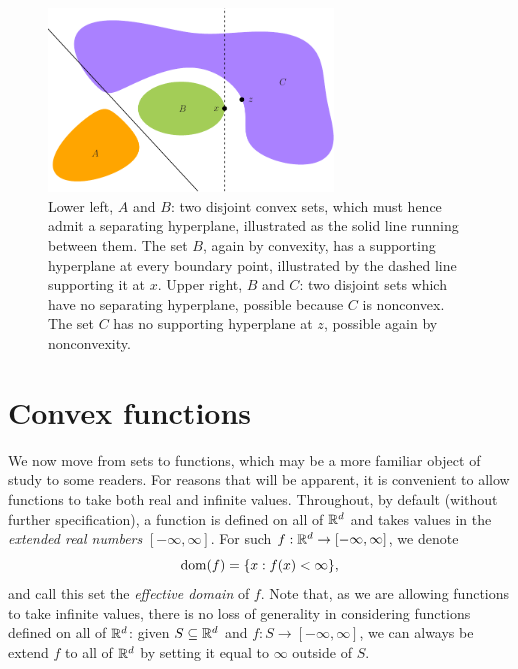 \begin{figure}[tb]
\centering
\includegraphics[width=0.675\textwidth]{fig/set_theorems.pdf}
\caption{Lower left, $A$ and $B$: two disjoint convex sets, which must hence 
  admit a separating hyperplane, illustrated as the solid line running between
  them. The set $B$, again by convexity, has a supporting hyperplane at every
  boundary point, illustrated by the dashed line supporting it at $x$. Upper
  right, $B$ and $C$: two disjoint sets which have no separating hyperplane,
  possible because $C$ is nonconvex. The set $C$ has no supporting hyperplane at
  $z$, possible again by nonconvexity.}    
\label{fig:set_theorems}
\end{figure}

\section{Convex functions}
\label{sec:convex_functions}

We now move from sets to functions, which may be a more familiar object of study
to some readers. For reasons that will be apparent, it is convenient to allow
functions to take both real and infinite values. Throughout, by default (without
further specification), a function is defined on all of $\mathbb{R}^d$ and takes values
in the \emph{extended real numbers} $[-\infty, \infty]$. For such $f : \mathbb{R}^d \to
[-\infty, \infty]$, we denote
\[
\operatorname{dom}(f) = \{x : f(x) < \infty \},
\]
and call this set the \emph{effective domain} of $f$. Note that, as we are
allowing functions to take infinite values, there is no loss of generality in
considering functions defined on all of $\mathbb{R}^d$: given $S \subseteq \mathbb{R}^d$ and $f
: S \to [-\infty, \infty]$, we can always be extend $f$ to all of $\mathbb{R}^d$ by
setting it equal to $\infty$ outside of $S$.

